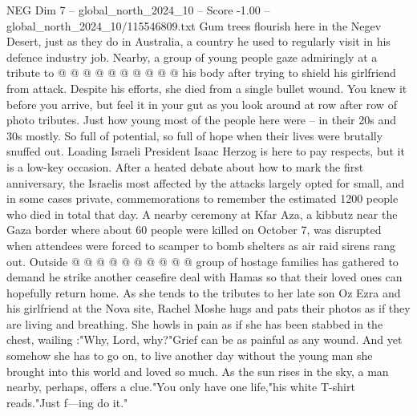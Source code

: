 \begin{textsample}{NEG Dim 7 – global\_north\_2024\_10 – Score -1.00 – global\_north\_2024\_10/115546809.txt}
Gum trees flourish here in the Negev Desert, just as they do in Australia, a country he used to regularly visit in his defence industry job.
Nearby, a group of young people gaze admiringly at a tribute to @ @ @ @ @ @ @ @ @ @ his body after trying to shield his girlfriend from attack.
Despite his efforts, she died from a single bullet wound.
You knew it before you arrive, but feel it in your gut as you look around at row after row of photo tributes.
Just how young most of the people here were -- in their 20s and 30s mostly.
So full of potential, so full of hope when their lives were brutally snuffed out.
Loading Israeli President Isaac Herzog is here to pay respects, but it is a low-key occasion.
After a heated debate about how to mark the first anniversary, the Israelis most affected by the attacks largely opted for small, and in some cases private, commemorations to remember the estimated 1200 people who died in total that day.
A nearby ceremony at Kfar Aza, a kibbutz near the Gaza border where about 60 people were killed on October 7, was disrupted when attendees were forced to scamper to bomb shelters as air raid sirens rang out.
Outside @ @ @ @ @ @ @ @ @ @ group of hostage families has gathered to demand he strike another ceasefire deal with Hamas so that their loved ones can hopefully return home.
As she tends to the tributes to her late son Oz Ezra and his girlfriend at the Nova site, Rachel Moshe hugs and pats their photos as if they are living and breathing.
She howls in pain as if she has been stabbed in the chest, wailing :"Why, Lord, why?"Grief can be as painful as any wound.
And yet somehow she has to go on, to live another day without the young man she brought into this world and loved so much.
As the sun rises in the sky, a man nearby, perhaps, offers a clue."You only have one life,"his white T-shirt reads."Just f---ing do it."

\end{textsample}
